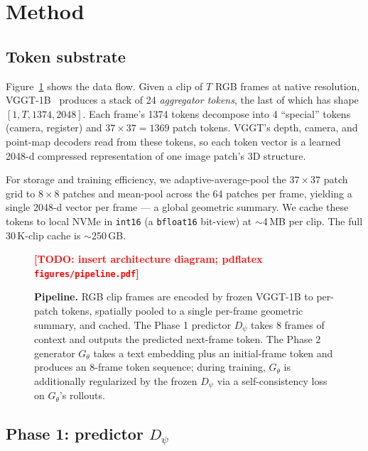 \documentclass[10pt,letterpaper]{article}
\newcommand{\TODO}[1]{\textcolor{red}{\textbf{[TODO: #1]}}}
\begin{document}
\section{Method}\label{sec:method}

\subsection{Token substrate}\label{sec:substrate}

Figure~\ref{fig:pipeline} shows the data flow. Given a clip of $T$ RGB frames at native resolution, VGGT-1B~\citep{vggt_2024} produces a stack of 24 \emph{aggregator tokens}, the last of which has shape $[1, T, 1374, 2048]$. Each frame's 1374 tokens decompose into 4 ``special'' tokens (camera, register) and $37 \times 37 = 1369$ patch tokens. VGGT's depth, camera, and point-map decoders read from these tokens, so each token vector is a learned 2048-d compressed representation of one image patch's 3D structure.

For storage and training efficiency, we adaptive-average-pool the $37 \times 37$ patch grid to $8 \times 8$ patches and mean-pool across the 64 patches per frame, yielding a single 2048-d vector per frame --- a global geometric summary. We cache these tokens to local NVMe in \texttt{int16} (a \texttt{bfloat16} bit-view) at $\sim$4\,MB per clip. The full 30\,K-clip cache is $\sim$250\,GB.

\begin{figure}[t]
\centering
\TODO{insert architecture diagram; pdflatex \texttt{figures/pipeline.pdf}}
\caption{\textbf{Pipeline.} RGB clip frames are encoded by frozen VGGT-1B to per-patch tokens, spatially pooled to a single per-frame geometric summary, and cached. The Phase 1 predictor $D_\psi$ takes 8 frames of context and outputs the predicted next-frame token. The Phase 2 generator $G_\theta$ takes a text embedding plus an initial-frame token and produces an 8-frame token sequence; during training, $G_\theta$ is additionally regularized by the frozen $D_\psi$ via a self-consistency loss on $G_\theta$'s rollouts.}
\label{fig:pipeline}
\end{figure}

\subsection{Phase 1: predictor $D_\psi$}\label{sec:phase1_arch}
\end{document}
